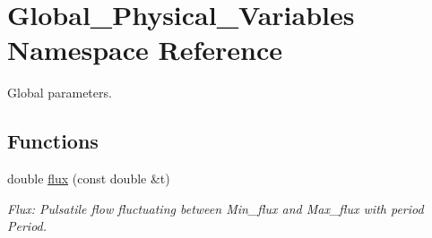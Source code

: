 \hypertarget{namespaceGlobal__Physical__Variables}{}\section{Global\+\_\+\+Physical\+\_\+\+Variables Namespace Reference}
\label{namespaceGlobal__Physical__Variables}


Global parameters.  


\subsection*{Functions}
\begin{DoxyCompactItemize}
\item 
double \hyperlink{namespaceGlobal__Physical__Variables_ad651484fe06209606bccefe6fe23be0c}{flux} (const double \&t)
\begin{DoxyCompactList}\small\item\em Flux\+: Pulsatile flow fluctuating between Min\+\_\+flux and Max\+\_\+flux with period Period. \end{DoxyCompactList}\end{DoxyCompactItemize}
